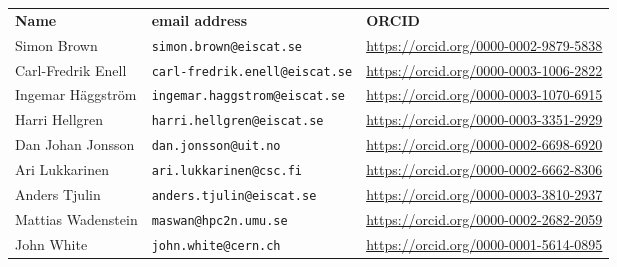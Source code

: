 \begin{tabular}{lll}
{\bf Name} & {\bf email address} & {\bf ORCID} \\
Simon Brown & {\tt simon.brown@eiscat.se} & \url{https://orcid.org/0000-0002-9879-5838} \\
Carl-Fredrik Enell & {\tt carl-fredrik.enell@eiscat.se} & \url{https://orcid.org/0000-0003-1006-2822}\\
Ingemar H\"{a}ggstr\"{o}m & {\tt ingemar.haggstrom@eiscat.se} & \url{https://orcid.org/0000-0003-1070-6915} \\
Harri Hellgren & {\tt harri.hellgren@eiscat.se} & \url{https://orcid.org/0000-0003-3351-2929}\\
Dan Johan Jonsson & {\tt dan.jonsson@uit.no} & \url{https://orcid.org/0000-0002-6698-6920}\\
Ari Lukkarinen & {\tt ari.lukkarinen@csc.fi} & \url{https://orcid.org/0000-0002-6662-8306}\\
Anders Tjulin & {\tt anders.tjulin@eiscat.se} & \url{https://orcid.org/0000-0003-3810-2937} \\
Mattias Wadenstein & {\tt maswan@hpc2n.umu.se} & \url{https://orcid.org/0000-0002-2682-2059} \\
John White & {\tt john.white@cern.ch} & \url{https://orcid.org/0000-0001-5614-0895} \\
\end{tabular}
